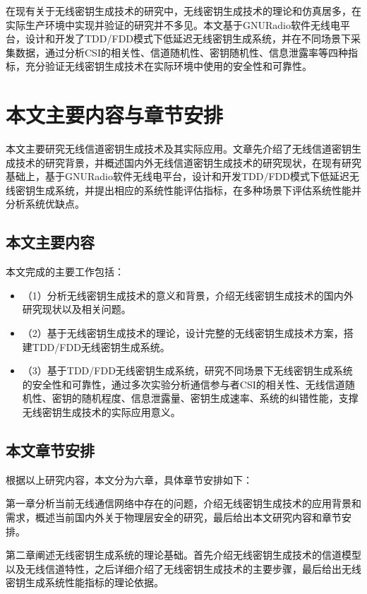 \documentclass[master]{seuthesis} %
\begin{document}
\begin{Main}
在现有关于无线密钥生成技术的研究中，无线密钥生成技术的理论和仿真居多，在实际生产环境中实现并验证的研究并不多见。本文基于GNURadio软件无线电平台，设计和开发了TDD/FDD模式下低延迟无线密钥生成系统，并在不同场景下采集数据，通过分析CSI的相关性、信道随机性、密钥随机性、信息泄露率等四种指标，充分验证无线密钥生成技术在实际环境中使用的安全性和可靠性。

\section{本文主要内容与章节安排}

本文主要研究无线信道密钥生成技术及其实际应用。文章先介绍了无线信道密钥生成技术的研究背景，并概述国内外无线信道密钥生成技术的研究现状，在现有研究基础上，基于GNURadio软件无线电平台，设计和开发TDD/FDD模式下低延迟无线密钥生成系统，并提出相应的系统性能评估指标，在多种场景下评估系统性能并分析系统优缺点。

\subsection{本文主要内容}

本文完成的主要工作包括：

\begin{itemize}
    \item（1）分析无线密钥生成技术的意义和背景，介绍无线密钥生成技术的国内外研究现状以及相关问题。
    \item（2）基于无线密钥生成技术的理论，设计完整的无线密钥生成技术方案，搭建TDD/FDD无线密钥生成系统。
    \item（3）基于TDD/FDD无线密钥生成系统，研究不同场景下无线密钥生成系统的安全性和可靠性，通过多次实验分析通信参与者CSI的相关性、无线信道随机性、密钥的随机程度、信息泄露量、密钥生成速率、系统的纠错性能，支撑无线密钥生成技术的实际应用意义。
\end{itemize}

\subsection{本文章节安排}

根据以上研究内容，本文分为六章，具体章节安排如下：

第一章分析当前无线通信网络中存在的问题，介绍无线密钥生成技术的应用背景和需求，概述当前国内外关于物理层安全的研究，最后给出本文研究内容和章节安排。

第二章阐述无线密钥生成系统的理论基础。首先介绍无线密钥生成技术的信道模型以及无线信道特性，之后详细介绍了无线密钥生成技术的主要步骤，最后给出无线密钥生成系统性能指标的理论依据。


\end{Main}
\end{document}
